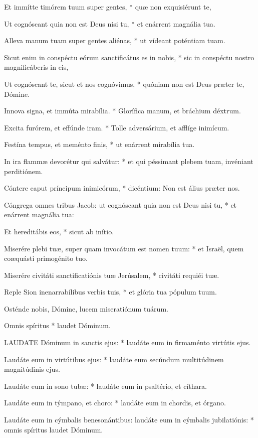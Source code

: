 Et immítte timórem tuum super gentes, * quæ non exquisiérunt te,

Ut cognóscant quia non est Deus nisi tu, * et enárrent magnália tua.

Alleva manum tuam super gentes aliénas, * ut vídeant poténtiam tuam.

Sicut enim in conspéctu eórum sanctificátus es in nobis, * sic in conspéctu nostro magnificáberis in eis,

Ut cognóscant te, sicut et nos cognóvimus, * quóniam non est Deus præter te, Dómine.

Innova signa, et immúta mirabília. * Glorífica manum, et bráchium déxtrum.

Excita furórem, et effúnde iram. * Tolle adversárium, et afflíge inimícum.

Festína tempus, et meménto finis, * ut enárrent mirabília tua.

In ira flammæ devorétur qui salvátur: * et qui péssimant plebem tuam, invéniant perditiónem.

Cóntere caput príncipum inimicórum, * dicéntium: Non est álius præter nos.

Cóngrega omnes tribus Jacob: ut cognóscant quia non est Deus nisi tu, * et enárrent magnália tua:

Et hereditábis eos, * sicut ab inítio.

Miserére plebi tuæ, super quam invocátum est nomen tuum: * et Israël, quem coæquásti primogénito tuo.

Miserére civitáti sanctificatiónis tuæ Jerúsalem, * civitáti requiéi tuæ.

Reple Sion inenarrabílibus verbis tuis, * et glória tua pópulum tuum.

 Osténde nobis, Dómine, lucem miseratiónum tuárum.

 Omnis spíritus * laudet Dóminum.


\lettrine[lines=2]{L}{AUDATE} Dóminum in sanctis ejus: * laudáte eum in firmaménto virtútis ejus.

Laudáte eum in virtútibus ejus: * laudáte eum secúndum multitúdinem magnitúdinis ejus.

Laudáte eum in sono tubæ: * laudáte eum in psaltério, et cíthara.

Laudáte eum in týmpano, et choro: * laudáte eum in chordis, et órgano.

Laudáte eum in cýmbalis benesonántibus: laudáte eum in cýmbalis jubilatiónis: * omnis spíritus laudet Dóminum.


